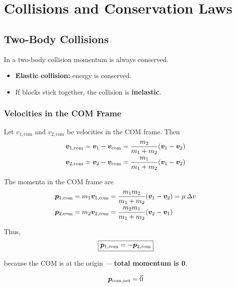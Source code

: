 
\chapter{Collisions and Conservation Laws}

\section{Two-Body Collisions}

In a two-body collision momentum is always conserved.
\begin{itemize}
    \item \textbf{Elastic collision:} energy is conserved.
    \item If blocks stick together, the collision is \textbf{inelastic}.
\end{itemize}

\subsection{Velocities in the COM Frame}

Let $v_{1,\text{com}}$ and $v_{2,\text{com}}$ be velocities in the COM frame. Then
\begin{align*}
    \bm{v}_{1,\text{com}} &= \bm{v}_1 - \bm{v}_\text{com}
        = \frac{m_2}{m_1+m_2}(\bm{v}_1 - \bm{v}_2) \\
    \bm{v}_{2,\text{com}} &= \bm{v}_2 - \bm{v}_\text{com}
        = \frac{m_1}{m_1+m_2}(\bm{v}_1 - \bm{v}_2)
\end{align*}

The momenta in the COM frame are
\begin{align*}
    \bm{p}_{1,\text{com}} &= m_1 \bm{v}_{1,\text{com}}
        = \frac{m_1 m_2}{m_1+m_2}(\bm{v}_1 - \bm{v}_2) = \mu\,\Delta v \\
    \bm{p}_{2,\text{com}} &= m_2 \bm{v}_{2,\text{com}}
        = \frac{m_2 m_1}{m_1+m_2}(\bm{v}_2 - \bm{v}_1)
\end{align*}

Thus,
\[
    \boxed{\bm{p}_{1,\text{com}} = -\bm{p}_{2,\text{com}}}
\]

because the COM is at the origin — \textbf{total momentum is 0}.

\[
    \bm{p}_{\text{com,net}} = \vec{0}
\]

